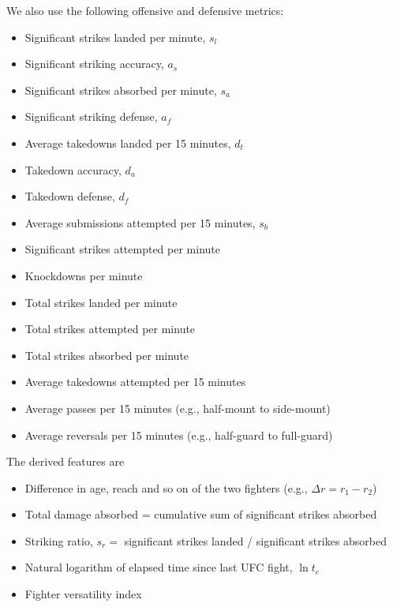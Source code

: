 \noindent
We also use the following offensive and defensive metrics:

\begin{itemize}[noitemsep]
  \item Significant strikes landed per minute, $s_l$
  \item Significant striking accuracy, $a_s$
  \item Significant strikes absorbed per minute, $s_a$
  \item Significant striking defense, $a_f$
  \item Average takedowns landed per 15 minutes, $d_t$
  \item Takedown accuracy, $d_a$
  \item Takedown defense, $d_f$
  \item Average submissions attempted per 15 minutes, $s_b$
\end{itemize}

\begin{itemize}[noitemsep]
  \item Significant strikes attempted per minute
  \item Knockdowns per minute
  \item Total strikes landed per minute
  \item Total strikes attempted per minute
  \item Total strikes absorbed per minute
  \item Average takedowns attempted per 15 minutes
  \item Average passes per 15 minutes (e.g., half-mount to side-mount)
  \item Average reversals per 15 minutes (e.g., half-guard to full-guard)
\end{itemize}

\noindent
The derived features are

\begin{itemize}[noitemsep]
  \item Difference in age, reach and so on of the two fighters (e.g., $\Delta r=r_1-r_2$)
  \item Total damage absorbed = cumulative sum of significant strikes absorbed
  \item Striking ratio, $s_r =$ significant strikes landed / significant strikes absorbed
  \item Natural logarithm of elapsed time since last UFC fight, $\ln t_e$
  \item Fighter versatility index
\end{itemize}

